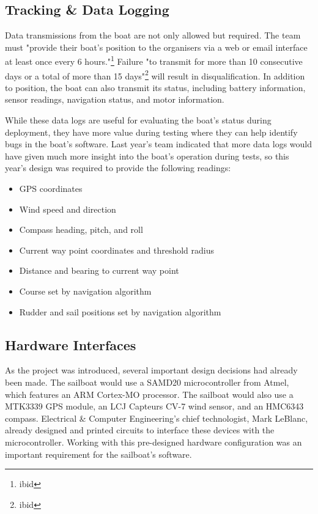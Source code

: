 \documentclass[12pt]{article}
\begin{document}
\subsection{Tracking \& Data Logging}
Data transmissions from the boat are not only allowed but required. The team must "provide their boat's position to the organisers via a web or email interface at least once every 6 hours."\footnote{ibid} Failure "to transmit for more than 10 consecutive days or a total of more than 15 days"\footnote{ibid} will result in disqualification. In addition to position, the boat can also transmit its status, including battery information, sensor readings, navigation status, and motor information.

While these data logs are useful for evaluating the boat's status during deployment, they have more value during testing where they can help identify bugs in the boat's software. Last year's team indicated that more data logs would have given much more insight into the boat's operation during tests, so this year's design was required to provide the following readings:
\begin{itemize}
	\setlength\itemsep{0.15em}
	\item GPS coordinates
	\item Wind speed and direction
	\item Compass heading, pitch, and roll
	\item Current way point coordinates and threshold radius
	\item Distance and bearing to current way point
	\item Course set by navigation algorithm
	\item Rudder and sail positions set by navigation algorithm
\end{itemize}

\subsection{Hardware Interfaces}
As the project was introduced, several important design decisions had already been made. The sailboat would use a SAMD20 microcontroller from Atmel, which features an ARM Cortex-MO processor. The sailboat would also use a MTK3339 GPS module, an LCJ Capteurs CV-7 wind sensor, and an HMC6343 compass. Electrical \& Computer Engineering's chief technologist, Mark LeBlanc, already designed and printed circuits to interface these devices with the microcontroller. Working with this pre-designed hardware configuration was an important requirement for the sailboat's software.
\end{document}
